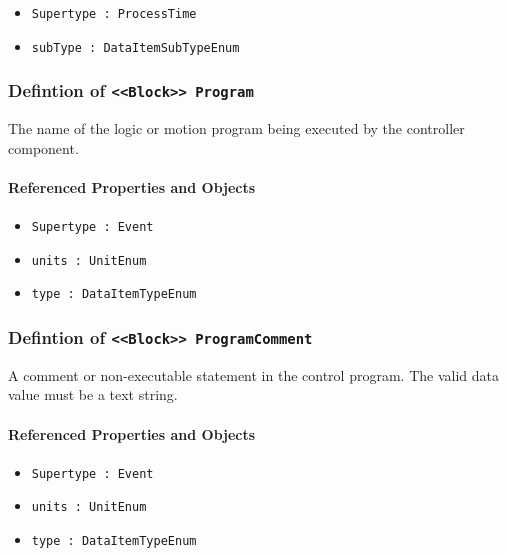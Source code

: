 \begin{itemize}
\item \texttt{Supertype : ProcessTime}

\item \texttt{subType : DataItemSubTypeEnum}

\end{itemize}
\FloatBarrier
\subsubsection{Defintion of \texttt{<<Block>> Program}}
  \label{type:Program}

\FloatBarrier

The name of the logic or motion program being executed by the controller component.

\FloatBarrier
\paragraph{Referenced Properties and Objects}

\begin{itemize}
\item \texttt{Supertype : Event}

\item \texttt{units : UnitEnum}

\item \texttt{type : DataItemTypeEnum}

\end{itemize}
\FloatBarrier
\subsubsection{Defintion of \texttt{<<Block>> ProgramComment}}
  \label{type:ProgramComment}

\FloatBarrier

A comment or non-executable statement in the control program.
 The valid data value must be a text string.

\FloatBarrier
\paragraph{Referenced Properties and Objects}

\begin{itemize}
\item \texttt{Supertype : Event}

\item \texttt{units : UnitEnum}

\item \texttt{type : DataItemTypeEnum}

\end{itemize}
\FloatBarrier
